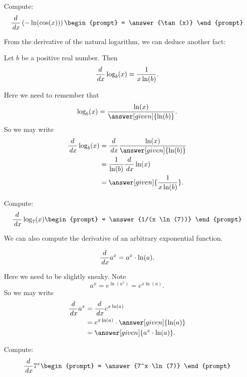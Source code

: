 \documentclass{ximera}
\begin{document}
\begin{question}
  Compute:
  \[
  \ddx \left(-\ln(\cos(x))\right)
  \begin{prompt}
    = \answer{\tan(x)}
  \end{prompt}
  \]
\end{question}



From the derivative of the natural logarithm, we can deduce another fact:

\begin{theorem}
  Let $b$ be a positive real number. Then
  \[
  \frac{d}{\,d x} \log_b(x) = \frac{1}{x\ln(b)}.
  \]
  \begin{explanation}
    Here we need to remember that
    \[
    \log_b(x) = \frac{\ln(x)}{\answer[given]{\ln(b)}}.
    \]
    So we may write
    \begin{align*}
      \ddx \log_b(x) &= \ddx \frac{\ln(x)}{\answer[given]{\ln(b)}}\\
      &= \frac{1}{\ln(b)} \ddx \ln(x)\\
      &= \answer[given]{\frac{1}{x\ln(b)}}.
    \end{align*}
  \end{explanation}
\end{theorem}

\begin{question}
  Compute:
  \[
  \ddx \log_7(x)
  \begin{prompt}
    = \answer{1/(x \ln(7))}
  \end{prompt}
  \]
\end{question}


We can also compute the derivative of an arbitrary exponential
function.

\begin{theorem}
  \[
  \frac{d}{\,d x} a^x = a^x\cdot \ln(a).
  \]
  \begin{explanation}
    Here we need to be slightly sneaky. Note
    \[
    a^x = e^{\ln(a^x)} = e^{x\ln(a)}.
    \]
    So we may write
    \begin{align*}
      \ddx a^x &= \ddx e^{x\ln(a)}\\
      &= e^{x\ln(a)} \cdot \answer[given]{\ln(a)}\\
      &= \answer[given]{a^x\cdot \ln(a)}.
    \end{align*}
  \end{explanation}
\end{theorem}

\begin{question}
  Compute:
  \[
  \ddx 7^x
  \begin{prompt}
    = \answer{7^x \ln(7)}
  \end{prompt}
  \]
\end{question}
\end{document}
